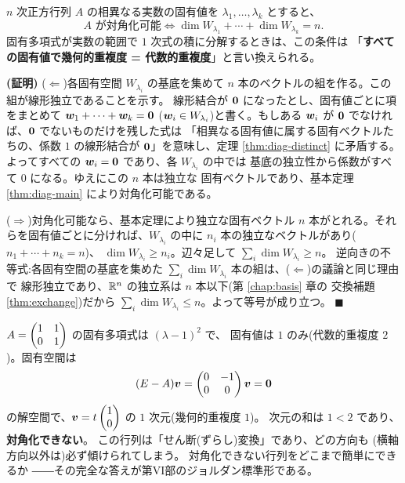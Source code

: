 \begin{teiri}[対角化可能性の判定]\label{thm:diag-criterion}
$n$ 次正方行列 $A$ の相異なる実数の固有値を
$\lambda_1, \dots, \lambda_k$ とすると、
\[
A \text{ が対角化可能} \iff
\dim W_{\lambda_1} + \cdots + \dim W_{\lambda_k} = n.
\]
固有多項式が実数の範囲で $1$ 次式の積に分解するときは、この条件は
「\textbf{すべての固有値で幾何的重複度 = 代数的重複度}」と言い換えられる。
\end{teiri}

\noindent\textbf{(証明)}\quad
($\Leftarrow$)各固有空間 $W_{\lambda_i}$ の基底を集めて
$n$ 本のベクトルの組を作る。この組が線形独立であることを示す。
線形結合が $\bm{0}$ になったとし、固有値ごとに項をまとめて
$\bm{w}_1 + \cdots + \bm{w}_k = \bm{0}$
($\bm{w}_i \in W_{\lambda_i}$)と書く。もしある $\bm{w}_i$ が
$\bm{0}$ でなければ、$\bm{0}$ でないものだけを残した式は
「相異なる固有値に属する固有ベクトルたちの、係数 $1$ の線形結合が
$\bm{0}$」を意味し、定理 \ref{thm:diag-distinct} に矛盾する。
よってすべての $\bm{w}_i = \bm{0}$ であり、各 $W_{\lambda_i}$ の中では
基底の独立性から係数がすべて $0$ になる。ゆえにこの $n$ 本は独立な
固有ベクトルであり、基本定理 \ref{thm:diag-main} により対角化可能である。

($\Rightarrow$)対角化可能なら、基本定理により独立な固有ベクトル
$n$ 本がとれる。それらを固有値ごとに分ければ、$W_{\lambda_i}$ の中に
$n_i$ 本の独立なベクトルがあり($n_1 + \cdots + n_k = n$)、
$\dim W_{\lambda_i} \ge n_i$。辺々足して
$\sum_i \dim W_{\lambda_i} \ge n$。
逆向きの不等式:各固有空間の基底を集めた
$\sum_i \dim W_{\lambda_i}$ 本の組は、($\Leftarrow$)の議論と同じ理由で
線形独立であり、$\mathbb{R}^n$ の独立系は $n$ 本以下(第 \ref{chap:basis} 章の
交換補題 \ref{thm:exchange})だから
$\sum_i \dim W_{\lambda_i} \le n$。よって等号が成り立つ。 $\blacksquare$

\begin{rei}[対角化できない行列]\label{rei:diag-shear}
$A = \begin{pmatrix}1 & 1 \\ 0 & 1\end{pmatrix}$ の固有多項式は $(\lambda - 1)^2$ で、
固有値は $1$ のみ(代数的重複度 $2$)。固有空間は
\[
(E - A)\bm{v} = \begin{pmatrix}0 & -1 \\ 0 & 0\end{pmatrix}\bm{v} = \bm{0}
\]
の解空間で、$\bm{v} = t\begin{pmatrix}1 \\ 0\end{pmatrix}$ の $1$ 次元(幾何的重複度 $1$)。
次元の和は $1 < 2$ であり、\textbf{対角化できない}。
この行列は「せん断(ずらし)変換」であり、どの方向も
(横軸方向以外は)必ず傾けられてしまう。
対角化できない行列をどこまで簡単にできるか
――その完全な答えが第VI部のジョルダン標準形である。
\end{rei}

